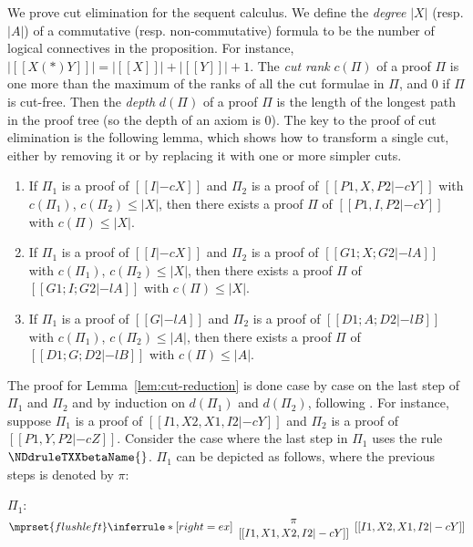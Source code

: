 We prove cut elimination for the sequent calculus. We define the
\textit{degree} $|X|$ (resp. $|A|$) of a commutative (resp. non-commutative)
formula to be the number of logical connectives in the proposition. For
instance, $|[[X (*) Y]]| = |[[X]]| + |[[Y]]| + 1$. The \textit{cut rank}
$c(\Pi)$ of a proof $\Pi$ is one more than the maximum of the ranks of all
the cut formulae in $\Pi$, and $0$ if $\Pi$ is cut-free. Then the
\textit{depth} $d(\Pi)$ of a proof $\Pi$ is the length of the longest path
in the proof tree (so the depth of an axiom is $0$). The key to the proof
of cut elimination is the following lemma, which shows how to transform a
single cut, either by removing it or by replacing it with one or more
simpler cuts.
\begin{lemma}
  \label{lem:cut-reduction}
  \begin{enumerate}
  \item If $\Pi_1$ is a proof of $[[I |-c X]]$ and $\Pi_2$ is a proof of
  $[[P1,X,P2 |-c Y]]$ with $c(\Pi_1)$, $c(\Pi_2)\leq |X|$, then there exists
  a proof $\Pi$ of $[[P1, I, P2 |-c Y]]$ with $c(\Pi)\leq |X|$.
  \item If $\Pi_1$ is a proof of $[[I |-c X]]$ and $\Pi_2$ is a proof of
  $[[G1; X; G2 |-l A]]$ with $c(\Pi_1)$, $c(\Pi_2)\leq |X|$, then there
  exists a proof $\Pi$ of $[[G1; I; G2 |-l A]]$ with $c(\Pi)\leq |X|$.
  \item If $\Pi_1$ is a proof of $[[G |-l A]]$ and $\Pi_2$ is a proof of
  $[[D1; A; D2 |-l B]]$ with $c(\Pi_1)$, $c(\Pi_2)\leq |A|$, then there
  exists a proof $\Pi$ of $[[D1; G; D2 |-l B]]$ with $c(\Pi)\leq |A|$.
  \end{enumerate}
\end{lemma}
The proof for Lemma~\ref{lem:cut-reduction} is done case by case on the last
step of $\Pi_1$ and $\Pi_2$ and by induction on $d(\Pi_1)$ and $d(\Pi_2)$,
following \cite{Mellies:2009}. For instance, suppose $\Pi_1$ is a proof of
$[[I1, X2, X1, I2 |-c Y]]$ and $\Pi_2$ is a proof of $[[P1, Y, P2 |-c Z]]$. 
Consider the case where the last step in $\Pi_1$ uses the rule
$\NDdruleTXXbetaName{}$. $\Pi_1$ can be depicted as follows, where the
previous steps is denoted by $\pi$:
\begin{center}
  \scriptsize
  $\Pi_1$:
  \begin{math}
    $$\mprset{flushleft}
    \inferrule* [right={\tiny ex}] {
      {
        \begin{array}{c}
          \pi \\
          {[[I1, X1, X2, I2 |-c Y]]}
        \end{array}
      }
    }{[[I1, X2, X1, I2 |-c Y]]}
  \end{math}
\end{center}
